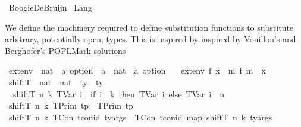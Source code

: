 %
\begin{isabellebody}%
%
%
\isadelimtheory
%
\endisadelimtheory
%
\isatagtheory
{}\isamarkupfalse%
\ BoogieDeBruijn\isanewline
{}\ Lang\isanewline
{}%
\endisatagtheory
{\isafoldtheory}%
%
\isadelimtheory
%
\endisadelimtheory
%
\begin{isamarkuptext}%
We define the machinery required to define substitution functions to substitute
arbitrary, potentially open, types. This is inspired by inspired by Vouillon's and Berghofer's 
POPLMark solutions%
\end{isamarkuptext}\isamarkuptrue%
\isamarkupfalse%
\ ext{\isacharunderscore}{\kern0pt}env\ {\isacharcolon}{\kern0pt}{\isacharcolon}{\kern0pt}\ {\isachardoublequoteopen}{\isacharparenleft}{\kern0pt}nat\ {\isasymRightarrow}\ {\isacharprime}{\kern0pt}a\ option{\isacharparenright}{\kern0pt}\ {\isasymRightarrow}\ {\isacharprime}{\kern0pt}a\ {\isasymRightarrow}\ {\isacharparenleft}{\kern0pt}nat\ {\isasymRightarrow}\ {\isacharprime}{\kern0pt}a\ option{\isacharparenright}{\kern0pt}{\isachardoublequoteclose}\isanewline
\ \ \ {\isachardoublequoteopen}ext{\isacharunderscore}{\kern0pt}env\ f\ x\ {\isacharequal}{\kern0pt}\ {\isacharparenleft}{\kern0pt}{\isasymlambda}m{\isachardot}{\kern0pt}\ f\ {\isacharparenleft}{\kern0pt}m{\isacharminus}{\kern0pt}{}{\isacharparenright}{\kern0pt}{\isacharparenright}{\kern0pt}{\isacharparenleft}{\kern0pt}{}\ {\isasymmapsto}\ x{\isacharparenright}{\kern0pt}{\isachardoublequoteclose}\isanewline
\isanewline
{}\isamarkupfalse%
\ shiftT\ {\isacharcolon}{\kern0pt}{\isacharcolon}{\kern0pt}\ {\isachardoublequoteopen}nat\ {\isasymRightarrow}\ nat\ {\isasymRightarrow}\ ty\ {\isasymRightarrow}\ ty{\isachardoublequoteclose}\ \isanewline
{}\isanewline
\ \ {\isachardoublequoteopen}shiftT\ n\ k\ {\isacharparenleft}{\kern0pt}TVar\ i{\isacharparenright}{\kern0pt}\ {\isacharequal}{\kern0pt}\ {\isacharparenleft}{\kern0pt}if\ i\ {\isacharless}{\kern0pt}\ k\ then\ TVar\ i\ else\ TVar\ {\isacharparenleft}{\kern0pt}i\ {\isacharplus}{\kern0pt}\ n{\isacharparenright}{\kern0pt}{\isacharparenright}{\kern0pt}{\isachardoublequoteclose}\isanewline
{\isacharbar}{\kern0pt}\ {\isachardoublequoteopen}shiftT\ n\ k\ {\isacharparenleft}{\kern0pt}TPrim\ tp{\isacharparenright}{\kern0pt}\ {\isacharequal}{\kern0pt}\ {\isacharparenleft}{\kern0pt}TPrim\ tp{\isacharparenright}{\kern0pt}{\isachardoublequoteclose}\isanewline
{\isacharbar}{\kern0pt}\ {\isachardoublequoteopen}shiftT\ n\ k\ {\isacharparenleft}{\kern0pt}TCon\ tcon{\isacharunderscore}{\kern0pt}id\ ty{\isacharunderscore}{\kern0pt}args{\isacharparenright}{\kern0pt}\ {\isacharequal}{\kern0pt}\ {\isacharparenleft}{\kern0pt}TCon\ tcon{\isacharunderscore}{\kern0pt}id\ {\isacharparenleft}{\kern0pt}map\ {\isacharparenleft}{\kern0pt}shiftT\ n\ k{\isacharparenright}{\kern0pt}\ ty{\isacharunderscore}{\kern0pt}args{\isacharparenright}{\kern0pt}{\isacharparenright}{\kern0pt}{\isachardoublequoteclose}\isanewline

\end{isabellebody}
